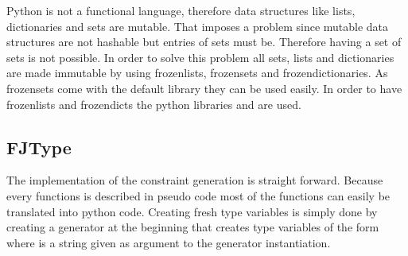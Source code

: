 Python is not a functional language, therefore data structures like lists, dictionaries and sets are mutable. That imposes a problem since mutable data structures are not hashable but entries of sets must be. Therefore having a set of sets is not possible.
In order to solve this problem all sets, lists and dictionaries are made immutable by using frozenlists, frozensets and frozendictionaries. As frozensets come with the default library they can be used easily. In order to have frozenlists and frozendicts the python libraries  and  are used.


\subsection{FJType}
The implementation of the constraint generation is straight forward. Because every functions is described in pseudo code most of the functions can easily be translated into python code.
Creating fresh type variables is simply done by creating a generator at the beginning that creates type variables of the form  where  is a string given as argument to the generator instantiation.
